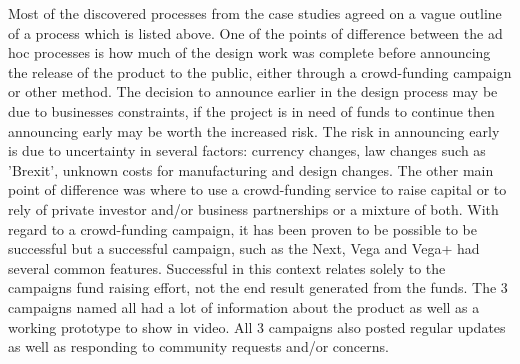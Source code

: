 Most of the discovered processes from the case studies agreed on a vague outline of a process which is listed above. One of the points of difference between the ad hoc processes is how much of the design work was complete before announcing the release of the product to the public, either through a crowd-funding campaign or other method. The decision to announce earlier in the design process may be due to businesses constraints, if the project is in need of funds to continue then announcing early may be worth the increased risk. The risk in announcing early is due to uncertainty in several factors: currency changes, law changes such as 'Brexit', unknown costs for manufacturing and design changes. The other main point of difference was where to use a crowd-funding service to raise capital or to rely of private investor and/or business partnerships or a mixture of both. With regard to a crowd-funding campaign, it has been proven to be possible to be successful but a successful campaign, such as the Next, Vega and Vega+ had several common features. Successful in this context relates solely to the campaigns fund raising effort, not the end result generated from the funds. The 3 campaigns named all had a lot of information about the product as well as a working prototype to show in video. All 3 campaigns also posted regular updates as well as responding to community requests and/or concerns.
